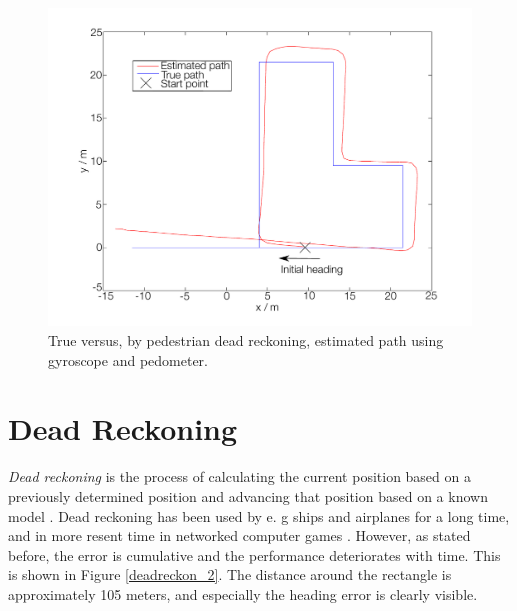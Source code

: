 \documentclass{LTHthesis}
\begin{document}
%
%
\begin{figure}[!hbt]

\includegraphics[width=1\textwidth ]{images/kinematic/deadreckon_1}
\caption{True versus, by pedestrian dead reckoning, estimated path using gyroscope and pedometer.}\label{deadreckon_1}
\end{figure}
%
\section{Dead Reckoning}

\emph{Dead reckoning} is the process of calculating the current position based on a previously determined position and advancing that position based on a known model \cite{ped_dead}. Dead reckoning has been used by e. g ships and airplanes for a long time, and in more resent time in networked computer games \cite{network_game}. However, as stated before, the error is cumulative and the performance deteriorates with time. This is shown in Figure \ref{deadreckon_2}. The distance around the rectangle is approximately 105 meters, and especially the heading error is clearly visible. 
\end{document}

